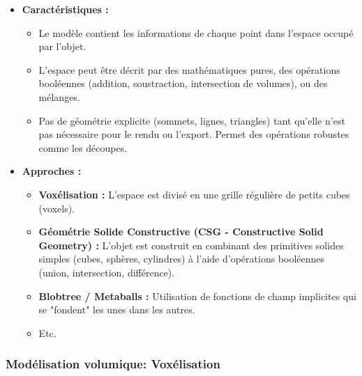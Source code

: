 \documentclass{article}
\begin{document}
\begin{itemize}
    \item \textbf{Caractéristiques :}
        \begin{itemize}
            \item Le modèle contient les informations de chaque point dans l'espace occupé par l'objet.
            \item L'espace peut être décrit par des mathématiques pures, des opérations booléennes (addition, soustraction, intersection de volumes), ou des mélanges.
            \item Pas de géométrie explicite (sommets, lignes, triangles) tant qu'elle n'est pas nécessaire pour le rendu ou l'export. Permet des opérations robustes comme les découpes.
        \end{itemize}
    \item \textbf{Approches :}
        \begin{itemize}
            \item \textbf{Voxélisation :} L'espace est divisé en une grille régulière de petits cubes (voxels).
            \item \textbf{Géométrie Solide Constructive (CSG - Constructive Solid Geometry) :} L'objet est construit en combinant des primitives solides simples (cubes, sphères, cylindres) à l'aide d'opérations booléennes (union, intersection, différence).
            \item \textbf{Blobtree / Metaballs :} Utilisation de fonctions de champ implicites qui se "fondent" les unes dans les autres.
            \item Etc.
        \end{itemize}
\end{itemize}

\subsubsection{Modélisation volumique: Voxélisation}
\end{document}

